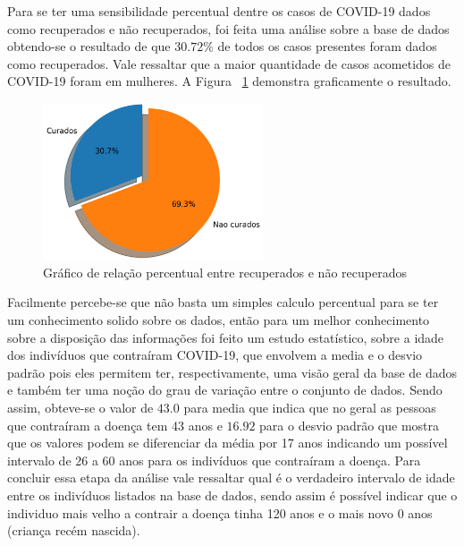 Para se ter uma sensibilidade percentual dentre os casos de COVID-19 dados como recuperados e não recuperados, foi feita uma análise sobre a base de dados obtendo-se o resultado de que $30.72\%$ de todos os casos presentes foram dados como recuperados. Vale ressaltar que a maior quantidade de casos acometidos de COVID-19 foram em mulheres. A Figura ~\ref{fig:uc} demonstra graficamente o resultado.
\begin{figure}[H]
\centering
    \includegraphics[width=6.5cm]{img/recuperados.png}
    \caption{Gráfico de relação percentual entre recuperados e não recuperados}
    \label{fig:uc} %
\end{figure}

Facilmente percebe-se que não basta um simples calculo percentual para se ter um conhecimento solido sobre os dados, então para um melhor conhecimento sobre a disposição das informações foi feito um estudo estatístico, sobre a idade dos indivíduos que contraíram COVID-19, que envolvem a media e o desvio padrão pois eles permitem ter, respectivamente, uma visão geral da base de dados e também ter uma noção do grau de variação entre o conjunto de dados. Sendo assim, obteve-se o valor de $43.0$ para media que indica que no geral as pessoas que contraíram a doença tem 43 anos e $16.92$ para o desvio padrão que mostra que os valores podem se diferenciar da média por 17 anos indicando um possível intervalo de 26 a 60 anos para os indivíduos que contraíram a doença. Para concluir essa etapa da análise vale ressaltar qual é o verdadeiro intervalo de idade entre os indivíduos listados na base de dados, sendo assim é possível indicar que o individuo mais velho a contrair a doença tinha 120 anos e o mais novo 0 anos (criança recém nascida).

